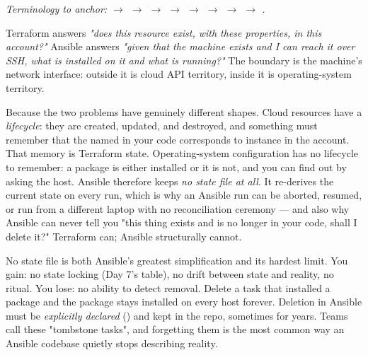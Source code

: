 \begin{center}\small\itshape\color{cInk!70}
Terminology to anchor:  $\rightarrow$  $\rightarrow$  $\rightarrow$  $\rightarrow$  $\rightarrow$  $\rightarrow$  $\rightarrow$  $\rightarrow$ .
\end{center}



 Terraform answers \emph{"does this resource exist, with these properties, in this account?"} Ansible answers \emph{"given that the machine exists and I can reach it over SSH, what is installed on it and what is running?"} The boundary is the machine's network interface: outside it is cloud API territory, inside it is operating-system territory.

 Because the two problems have genuinely different shapes. Cloud resources have a \emph{lifecycle}: they are created, updated, and destroyed, and something must remember that the  named  in your code corresponds to instance  in the account. That memory is Terraform state. Operating-system configuration has no lifecycle to remember: a package is either installed or it is not, and you can find out by asking the host. Ansible therefore keeps \emph{no state file at all}. It re-derives the current state on every run, which is why an Ansible run can be aborted, resumed, or run from a different laptop with no reconciliation ceremony --- and also why Ansible can never tell you "this thing exists and is no longer in your code, shall I delete it?" Terraform can; Ansible structurally cannot.

\begin{tradeoff}
No state file is both Ansible's greatest simplification and its hardest limit. You gain: no state locking (Day 7's  table), no drift between state and reality, no  ritual. You lose: no ability to detect removal. Delete a task that installed a package and the package stays installed on every host forever. Deletion in Ansible must be \emph{explicitly declared} () and kept in the repo, sometimes for years. Teams call these "tombstone tasks", and forgetting them is the most common way an Ansible codebase quietly stops describing reality.
\end{tradeoff}

